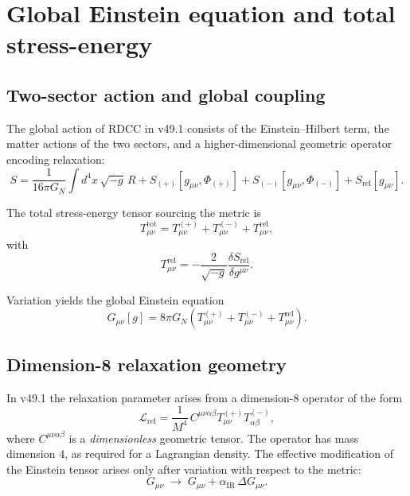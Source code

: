 \documentclass[11pt,a4paper]{article}
\begin{document}
\section{Global Einstein equation and total stress-energy}

\subsection{Two-sector action and global coupling}

The global action of RDCC in v49.1 consists of the Einstein--Hilbert term,
the matter actions of the two sectors, and a higher-dimensional geometric
operator encoding relaxation:
\begin{equation}
  S
  =
  \frac{1}{16\pi G_N}
  \int d^{4}x\,\sqrt{-g}\, R
  +
  S_{(+)}[g_{\mu\nu},\Phi_{(+)}]
  +
  S_{(-)}[g_{\mu\nu},\Phi_{(-)}]
  +
  S_{\mathrm{rel}}[g_{\mu\nu}].
\end{equation}

The total stress-energy tensor sourcing the metric is
\begin{equation}
  T^{\mathrm{tot}}_{\mu\nu}
  =
  T^{(+)}_{\mu\nu}
  +
  T^{(-)}_{\mu\nu}
  +
  T^{\mathrm{rel}}_{\mu\nu},
\end{equation}
with
\begin{equation}
  T^{\mathrm{rel}}_{\mu\nu}
  =
  -\frac{2}{\sqrt{-g}}
  \frac{\delta S_{\mathrm{rel}}}{\delta g^{\mu\nu}}.
\end{equation}

Variation yields the global Einstein equation
\begin{equation}
  G_{\mu\nu}[g]
  =
  8\pi G_N
  \left(
    T^{(+)}_{\mu\nu}
    +
    T^{(-)}_{\mu\nu}
    +
    T^{\mathrm{rel}}_{\mu\nu}
  \right).
  \label{eq:globalEinstein}
\end{equation}

\subsection{Dimension-8 relaxation geometry}

In v49.1 the relaxation parameter arises from a dimension-8 operator of the
form
\begin{equation}
  \mathcal{L}_{\mathrm{rel}}
  =
  \frac{1}{M^{4}}\,
  C^{\mu\nu\alpha\beta}
  T^{(+)}_{\mu\nu} T^{(-)}_{\alpha\beta},
\end{equation}
where \(C^{\mu\nu\alpha\beta}\) is a \emph{dimensionless} geometric tensor.
The operator has mass dimension 4, as required for a Lagrangian density.
The effective modification of the Einstein tensor arises only after
variation with respect to the metric:
\begin{equation}
  G_{\mu\nu}
  \;\longrightarrow\;
  G_{\mu\nu} + \alpha_{\mathrm{IR}}\,\Delta G_{\mu\nu}.
\end{equation}
\end{document}
